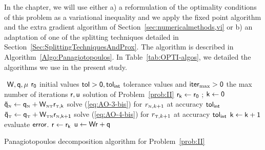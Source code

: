 In the chapter, we will use either a) a reformulation of the optimality conditions of this problem as a variational inequality and we apply the fixed point algorithm and the extra gradient algorithm of Section~\ref{sec:numericalmethods,vi} or b) an adaptation of one of the splitting techniques detailed in Section~\ref{Sec:SplittingTechniquesAndProx}. The algorithm is described in Algorithm~\ref{Algo:Panagiotopoulos}.
In Table~\ref{tab:OPTI-algos}, we detailed the algorithms we use in the present study.

\begin{algorithm}
  \begin{algorithmic}
    {\sf
      \STATE $ $ 
      \REQUIRE $\sf W,q,\mu$
      \REQUIRE $\sf r_0$ initial values
      \REQUIRE $\sf tol >0, tol_{{int}}$  tolerance values and $\sf iter_{\max}  >0$ the max number of iterations
      \ENSURE  $\sf r,u$ solution of Problem~\ref{prob:II}
      \STATE $\sf r_{k} \leftarrow r_0 $ ; $\sf k \leftarrow 0$ 
      \STATE $\sf \tilde q_{\hbox{\tiny{N}}} \leftarrow q_{\hbox{\tiny{N}}} + W_{{\hbox{\tiny{N}}}{\hbox{\tiny{T}}}}r_{{\hbox{\tiny{T}}},k}$
      \STATE solve (\ref{eq:AO-3-bis}) for $r_{{\hbox{\tiny{N}}},k+1}$ at accuracy $\sf tol_{{int}}$
      \STATE $\sf  \tilde q_{\hbox{\tiny{T}}} \leftarrow q_{\hbox{\tiny{T}}} + W_{{\hbox{\tiny{T}}}{\hbox{\tiny{N}}}}r_{{\hbox{\tiny{N}}},k+1}$
      \STATE solve (\ref{eq:AO-4-bis}) for $r_{{\hbox{\tiny{T}}},k+1}$ at accuracy $\sf tol_{{int}}$
      \STATE $\sf k \leftarrow k+1$
      \STATE evaluate $\sf error$.
      \ENDWHILE
      \STATE $\sf r \leftarrow r_{k}$ 
      \STATE $\sf u \leftarrow W r + q$ 
    }
  \end{algorithmic}
  \caption{Panagiotopoulos decomposition algorithm for Problem~\ref{prob:II}}  \label{Algo:Panagiotopoulos}
\end{algorithm}


